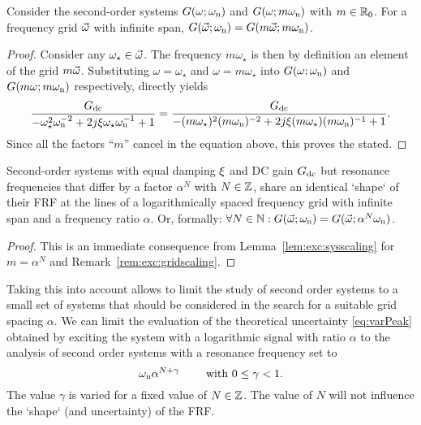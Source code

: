   \begin{lemma} \label{lem:exc:sysscaling}
  Consider the second-order systems $G(\omega; \omega_{\mathrm{n}})$ and $G(\omega; m\omega_{\mathrm{n}})$ with $m \in \mathbb{R}_{0}$. 
  For a frequency grid $\vec{\omega}$ with infinite span, $G(\vec{\omega}; \omega_{\mathrm{n}}) = G(m \vec{\omega}; m\omega_{\mathrm{n}})$.
  \end{lemma}
  \begin{proof}
  Consider any $\omega_{\star} \in \vec{\omega}$. The frequency $m\omega_{\star}$ is then by definition an element of the grid $m\vec{\omega}$.
  Substituting $\omega = \omega_{\star}$ and $\omega = m \omega_{\star}$  into  $G(\omega; \omega_{\mathrm{n}})$ and $G(m\omega; m\omega_{\mathrm{n}})$  respectively, directly yields
  \begin{equation}
    \frac{G_{\mathrm{dc}}}{- \omega_{\star}^2 \omega_{\mathrm{n}}^{-2} + 2j\xi \omega_{\star} \omega_{\mathrm{n}}^{-1} + 1} = 
    \frac{G_{\mathrm{dc}}}{- (m\omega_{\star})^2 (m\omega_{\mathrm{n}})^{-2} + 2j\xi (m\omega_{\star}) (m\omega_{\mathrm{n}})^{-1} + 1}
    \text{.}
  \end{equation}
  Since all the factors ``$m$'' cancel in the equation above, this proves the stated.
  \end{proof}

  \begin{theorem}
    Second-order  systems with equal damping $\xi$ and \gls{DC} gain $G_{\mathrm{dc}}$ but resonance frequencies that differ by a factor $\alpha^N$ with $N \in \mathbb{Z}$, share an identical `shape` of their \gls{FRF} at the lines of a logarithmically spaced frequency grid with infinite span and a frequency ratio $\alpha$.
    Or, formally: $\forall N \in \mathbb{N}: G(\vec{\omega};\omega_{\mathrm{n}}) = G(\vec{\omega}; \alpha^{N}\omega_{\mathrm{n}})$.
  \end{theorem}
  \begin{proof}
    This is an immediate consequence from Lemma~\ref{lem:exc:sysscaling} for $m= \alpha^{N}$ and Remark~\ref{rem:exc:gridscaling}.
  \end{proof}

  Taking this into account allows to limit the study of second order systems to a small set of systems that should be considered in the search for a suitable grid spacing $\alpha$.
  We can limit the evaluation of the theoretical uncertainty \eqref{eq:varPeak} obtained by exciting the system with a logarithmic signal with ratio $\alpha$ to the analysis of second order systems with a resonance frequency set to
  \begin{equation}
    \omega_{\mathrm{n}} \alpha^{N+\gamma}\qquad \text{ with } 0 \leq \gamma < 1\text{.}
    \label{eq:theoreticalBestVariationOmega}
  \end{equation}
  The value $\gamma$ is varied for a fixed value of $N \in \mathbb{Z}$.
  The value of $N$ will not influence the `shape` (and uncertainty) of the FRF.

